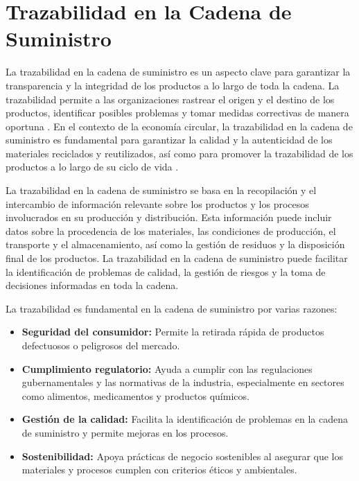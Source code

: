 \documentclass[main.tex]{subfiles}
\begin{document}
\section{Trazabilidad en la Cadena de Suministro}

La trazabilidad en la cadena de suministro es un aspecto clave para garantizar la transparencia y la integridad de los productos a lo largo de toda la cadena. La trazabilidad permite a las organizaciones rastrear el origen y el destino de los productos, identificar posibles problemas y tomar medidas correctivas de manera oportuna \cite{cepeda2010trazabilidad}. En el contexto de la economía circular, la trazabilidad en la cadena de suministro es fundamental para garantizar la calidad y la autenticidad de los materiales reciclados y reutilizados, así como para promover la trazabilidad de los productos a lo largo de su ciclo de vida \cite{melendez2021economia}.

La trazabilidad en la cadena de suministro se basa en la recopilación y el intercambio de información relevante sobre los productos y los procesos involucrados en su producción y distribución. Esta información puede incluir datos sobre la procedencia de los materiales, las condiciones de producción, el transporte y el almacenamiento, así como la gestión de residuos y la disposición final de los productos. La trazabilidad en la cadena de suministro puede facilitar la identificación de problemas de calidad, la gestión de riesgos y la toma de decisiones informadas en toda la cadena.

La trazabilidad es fundamental en la cadena de suministro por varias razones:

\begin{itemize}
    \item \textbf{Seguridad del consumidor:} Permite la retirada rápida de productos defectuosos o peligrosos del mercado.
    \item \textbf{Cumplimiento regulatorio:} Ayuda a cumplir con las regulaciones gubernamentales y las normativas de la industria, especialmente en sectores como alimentos, medicamentos y productos químicos.
    \item \textbf{Gestión de la calidad:} Facilita la identificación de problemas en la cadena de suministro y permite mejoras en los procesos.
    \item \textbf{Sostenibilidad:} Apoya prácticas de negocio sostenibles al asegurar que los materiales y procesos cumplen con criterios éticos y ambientales.
\end{itemize}
\end{document}
